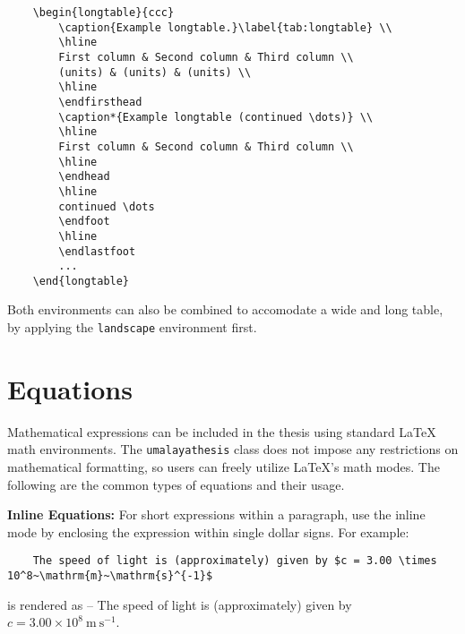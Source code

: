 \documentclass{umalayathesis}
\begin{document}
\begin{verbatim}
    \begin{longtable}{ccc}
        \caption{Example longtable.}\label{tab:longtable} \\
        \hline
        First column & Second column & Third column \\
        (units) & (units) & (units) \\
        \hline
        \endfirsthead
        \caption*{Example longtable (continued \dots)} \\
        \hline
        First column & Second column & Third column \\
        \hline
        \endhead
        \hline
        continued \dots
        \endfoot
        \hline
        \endlastfoot
        ...
    \end{longtable}
\end{verbatim}

Both environments can also be combined to accomodate a wide and long table, by applying the \texttt{landscape} environment first.

\section{Equations}

Mathematical expressions can be included in the thesis using standard \LaTeX{} math environments. The \texttt{umalayathesis} class does not impose any restrictions on mathematical formatting, so users can freely utilize \LaTeX{'s} math modes. The following are the common types of equations and their usage.

\textbf{Inline Equations:} For short expressions within a paragraph, use the inline mode by enclosing the expression within single dollar signs. For example: 
\begin{verbatim}
    The speed of light is (approximately) given by $c = 3.00 \times 10^8~\mathrm{m}~\mathrm{s}^{-1}$
\end{verbatim}
is rendered as -- The speed of light is (approximately) given by $c = 3.00 \times 10^8~\mathrm{m}~\mathrm{s}^{-1}$.
\end{document}
